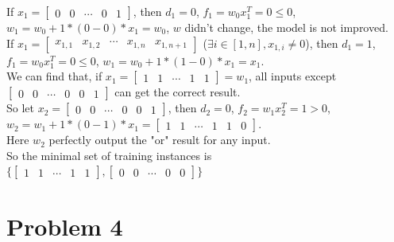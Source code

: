 \documentclass[paper=a4, fontsize=11pt]{scrartcl} %
\numberwithin{equation}{section} %
\numberwithin{figure}{section} %
\numberwithin{table}{section} %
\begin{document}
If $x_1=\begin{bmatrix}0 & 0 & \cdots & 0 & 1\end{bmatrix}$, then $d_1=0$,
$f_1=w_0x_1^T=0 \leqslant 0$,
$w_1=w_0+1*(0-0)*x_1 = w_0$, $w$ didn't change, the model is not improved.\\

If $x_1=\begin{bmatrix}x_{1, 1} & x_{1, 2} & \cdots & x_{1, n} & x_{1, n+1}\end{bmatrix}$ 
    ($\exists i \in [1, n], x_{1, i} \neq 0$), then $d_1=1$, 
$f_1=w_0x_1^T=0 \leqslant 0$, $w_1=w_0+1*(1-0)*x_1 = x_1$.\\

We can find that, if $x_1=\begin{bmatrix}1 & 1 & \cdots & 1 & 1\end{bmatrix}=w_1$, 
all inputs except $\begin{bmatrix}0 & 0 & \cdots & 0 & 0 & 1\end{bmatrix}$ can get the correct result.\\

So let $x_2=\begin{bmatrix}0 & 0 & \cdots & 0 & 0 & 1\end{bmatrix}$, then $d_2=0$,
$f_2=w_1x_2^T=1>0$,
$w_2=w_1+1*(0-1)*x_1=\begin{bmatrix}1 & 1 & \cdots & 1 & 1 & 0\end{bmatrix}$.\\

Here $w_2$ perfectly output the "or" result for any input.\\

So the minimal set of training instances is $\{\begin{bmatrix}1 & 1 & \cdots & 1 & 1\end{bmatrix},
\begin{bmatrix}0 & 0 & \cdots & 0 & 0\end{bmatrix}\}$



\section{Problem 4}
\end{document}
